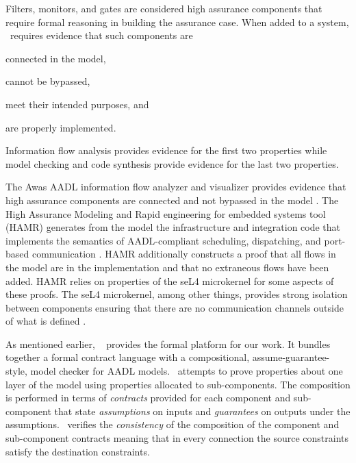 Filters, monitors, and gates are considered high assurance components that require formal reasoning in building the assurance case.
When added to a system, \brfcs\ requires evidence that such components are
\begin{compactenum}
	\item connected in the model,
	\item cannot be bypassed,
	\item meet their intended purposes, and
	\item are properly implemented.
\end{compactenum}
Information flow analysis provides evidence for the first two properties while model checking and code synthesis provide evidence for the last two properties.

The Awas AADL information flow analyzer and visualizer provides evidence that high assurance components are connected and not bypassed in the model \cite{awas}.
The High Assurance Modeling and Rapid engineering for embedded systems tool (HAMR) generates from the model the infrastructure and integration code that implements the semantics of AADL-compliant scheduling, dispatching, and port-based communication \cite{hamr}.
HAMR additionally constructs a proof that all flows in the model are in the implementation and that no extraneous flows have been added.
HAMR relies on properties of the seL4 microkernel for some aspects of these proofs.
The seL4 microkernel, among other things, provides strong isolation between components ensuring that there are no communication channels outside of what is defined \cite{sel4-sosp09, sel4-tocs14, sel4-cacm18}.

As mentioned earlier,
\agr\ \cite{compositional-analysis-agree,nfm:agree} provides the
formal platform for our work. It bundles together a formal contract
language with a compositional, assume-guarantee-style, model checker
for AADL models.  \agr\ attempts to prove properties about one layer
of the model using properties allocated to sub-components.  The
composition is performed in terms of \emph{contracts} provided for
each component and sub-component that state \emph{assumptions} on
inputs and \emph{guarantees} on outputs under the assumptions.
\agr\ verifies the \emph{consistency} of the composition of the
component and sub-component contracts meaning that in every connection
the source constraints satisfy the destination constraints.


